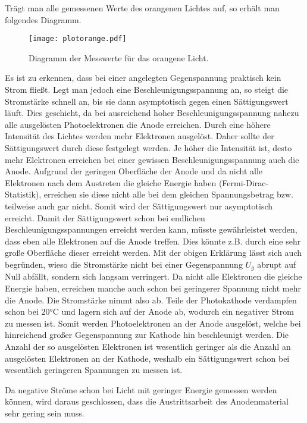 Trägt man alle gemessenen Werte des orangenen Lichtes auf, so erhält man folgendes Diagramm.

\begin{figure}[H]
  \centering
  \texttt{[image: plotorange.pdf]}
  \caption{Diagramm der Messwerte für das orangene Licht.}
  \label{fig:plotorange}
\end{figure}

Es ist zu erkennen, dass bei einer angelegten Gegenspannung praktisch kein Strom fließt. Legt man
jedoch eine Beschleunigungsspannung an, so steigt die Stromstärke schnell an, bis sie dann
asymptotisch gegen einen Sättigungswert läuft.
Dies geschieht, da bei ausreichend hoher Beschleunigungsspannung nahezu alle ausgelösten
Photoelektronen die Anode erreichen. Durch eine höhere Intensität des Lichtes werden mehr
Elektronen ausgelöst. Daher sollte der Sättigungswert durch diese festgelegt werden. Je höher
die Intensität ist, desto mehr Elektronen erreichen bei einer gewissen Beschleunigungsspannung
auch die Anode.
Aufgrund der geringen Oberfläche der Anode und da nicht alle Elektronen nach dem Austreten die gleiche Energie haben (Fermi-Dirac-Statistik), erreichen sie diese
nicht alle bei dem gleichen Spannungsbetrag bzw. teilweise auch gar nicht. Somit wird der Sättigungswert nur asymptotisch erreicht.
Damit der Sättigungswert schon bei endlichen Beschleunigungsspannungen erreicht werden kann, müsste gewährleistet werden, dass eben
alle Elektronen auf die Anode treffen. Dies könnte z.B. durch eine sehr große Oberfläche dieser erreicht werden.
Mit der obigen Erklärung lässt sich auch begründen, wieso die Stromstärke nicht bei einer Gegenspannung $U_g$ abrupt auf Null abfällt, sondern
sich langsam verringert. Da nicht alle Elektronen die gleiche Energie haben, erreichen manche auch schon bei geringerer Spannung nicht mehr
die Anode. Die Stromstärke nimmt also ab.
Teile der Photokathode verdampfen schon bei $20$°C und lagern sich auf der Anode ab, wodurch ein negativer Strom zu messen ist.
Somit werden Photoelektronen
an der Anode ausgelöst, welche bei hinreichend großer Gegenspannung zur Kathode hin beschleunigt werden. Die Anzahl
der so ausgelösten Elektronen ist wesentlich geringer als die Anzahl an ausgelösten Elektronen an der Kathode, weshalb
ein Sättigungswert schon bei wesentlich geringeren Spannungen zu messen ist.

Da negative Ströme schon bei Licht mit geringer Energie gemessen werden können, wird daraus geschlossen, dass die Austrittsarbeit des
Anodenmaterial sehr gering sein muss.


